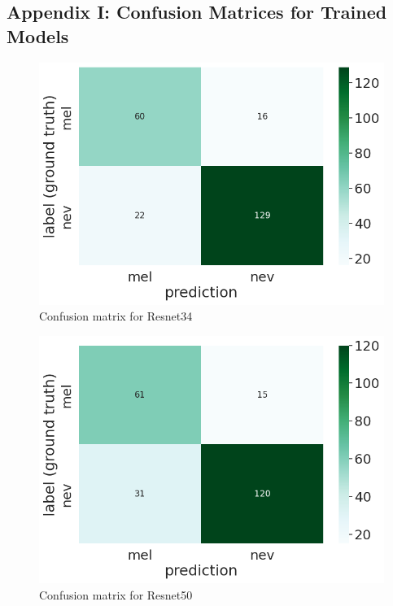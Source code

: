 \documentclass[12pt, a4paper]{article}
\begin{document}
\subsection*{Appendix I: Confusion Matrices for Trained Models}
\begin{figure}[h]
    \centering
    \setlength{\fboxsep}{8pt}
    \includegraphics[scale=0.5, fbox]{images/matrix-resnet34.png}
    \caption{Confusion matrix for Resnet34}
    \label{fig:matrix-resnet34}
\end{figure}

\begin{figure}[h]
    \centering
    \setlength{\fboxsep}{8pt}
    \includegraphics[scale=0.5, fbox]{images/matrix-resnet50.png}
    \caption{Confusion matrix for Resnet50}
    \label{fig:matrix-resnet50}
\end{figure}
\end{document}
